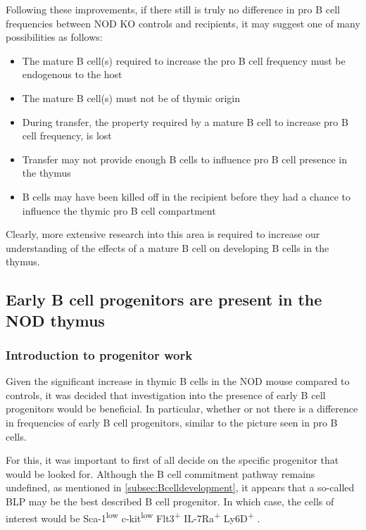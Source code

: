 Following these improvements, if there still is truly no difference in pro B cell frequencies between NOD KO controls and recipients, it may suggest one of many possibilities as follows:
\begin{itemize}
\item The mature B cell(s) required to increase the pro B cell frequency must be endogenous to the host
\item The mature B cell(s) must not be of thymic origin
\item During transfer, the property required by a mature B cell to increase pro B cell frequency, is lost
\item Transfer may not provide enough B cells to influence pro B cell presence in the thymus
\item B cells may have been killed off in the recipient before they had a chance to influence the thymic pro B cell compartment
\end{itemize}

Clearly, more extensive research into this area is required to increase our understanding of the effects of a mature B cell on developing B cells in the thymus.



\subsection{Early B cell progenitors are present in the NOD thymus}

\subsubsection{Introduction to progenitor work}

Given the significant increase in thymic B cells in the NOD mouse compared to controls, it was decided that investigation into the presence of early B cell progenitors would be beneficial.
In particular, whether or not there is a difference in frequencies of early B cell progenitors, similar to the picture seen in pro B cells.

For this, it was important to first of all decide on the specific progenitor that would be looked for.
Although the B cell commitment pathway remains undefined, as mentioned in \cref{subsec:Bcelldevelopment}, it appears that a so-called BLP may be the best described B cell progenitor.
In which case, the cells of interest would be Sca-1\textsuperscript{low} c-kit\textsuperscript{low} Flt3\textsuperscript{+} IL-7Ra\textsuperscript{+} Ly6D\textsuperscript{+} \citep{Mansson2010, Inlay2009, Zhang2013}.

